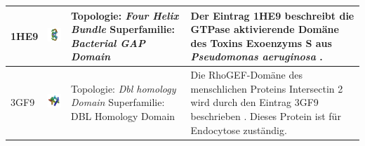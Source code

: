 \documentclass{article}
\begin{document}
\begin{table}
\begin{center}
\begin{tabular}{ | C{9mm} | C{30mm} | C{29mm} | C{38mm} | }
1HE9  & \includegraphics[width=30mm, trim= -10 -5 -5 -10]{1HE9_bio_r_500.jpg}  & Topologie: \newline \textit{Four Helix Bundle} \newline Superfamilie: \newline \textit{Bacterial GAP Domain}   & Der Eintrag 1HE9 beschreibt die GTPase aktivierende Dom\"ane des Toxins Exoenzyms S aus \textit{Pseudomonas aeruginosa} \cite{1he9}. \\ \hline
3GF9  & \includegraphics[width=30mm, trim= -10 -5 -5 -10]{3GF9_bio_r_500.jpg} & Topologie: \newline \textit{Dbl homology Domain} \newline Superfamilie: \newline DBL Homology Domain & Die RhoGEF-Dom\"ane des menschlichen Proteins Intersectin 2 wird durch den Eintrag 3GF9 beschrieben \cite{3gf9}. Dieses Protein ist f\"ur Endocytose zust\"andig. \\ 
\hline

\end{tabular}
\end{center}
\end{table}
\end{document}
